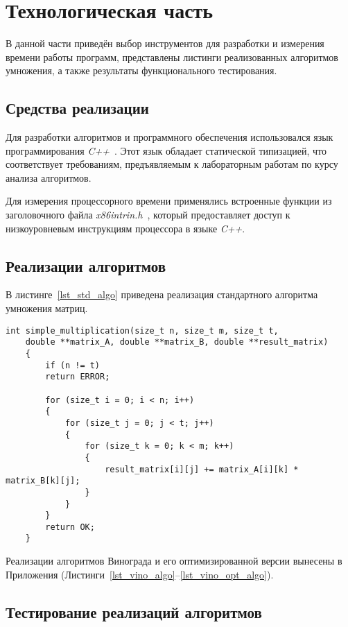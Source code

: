 \chapter{Технологическая часть}

В данной части приведён выбор инструментов для разработки и измерения времени работы программ, представлены листинги реализованных алгоритмов умножения, а также результаты функционального тестирования.

\section{Средства реализации}

Для разработки алгоритмов и программного обеспечения использовался язык программирования \textit{C++}~\cite{cpp}. 
Этот язык обладает статической типизацией, что соответствует требованиям, предъявляемым к лабораторным работам по курсу анализа алгоритмов.

Для измерения процессорного времени применялись встроенные функции из заголовочного файла \textit{x86intrin.h}~\cite{intrin}, 
который предоставляет доступ к низкоуровневым инструкциям процессора в языке \textit{C++}.

\section{Реализации алгоритмов}

В листинге~\ref{lst_std_algo} приведена реализация стандартного алгоритма умножения матриц.

\begin{lstlisting}[label=lst_std_algo, caption=Реализация стандартного алгоритма умножения матриц]
	int simple_multiplication(size_t n, size_t m, size_t t,
	double **matrix_A, double **matrix_B, double **result_matrix)
	{
		if (n != t)
		return ERROR;
		
		for (size_t i = 0; i < n; i++)
		{
			for (size_t j = 0; j < t; j++)
			{
				for (size_t k = 0; k < m; k++)
				{
					result_matrix[i][j] += matrix_A[i][k] * matrix_B[k][j];
				}
			}
		}
		return OK;
	}
\end{lstlisting}

Реализации алгоритмов Винограда и его оптимизированной версии вынесены в Приложения (Листинги~\ref{lst_vino_algo}--\ref{lst_vino_opt_algo}).

\section{Тестирование реализаций алгоритмов}

